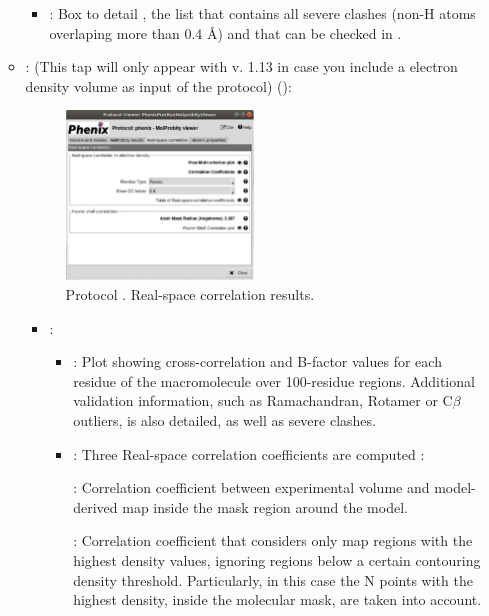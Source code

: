 \begin{itemize}
\begin{itemize}
\begin{itemize}
         \item {}: Box to detail , the list that contains all severe clashes (non-H atoms overlaping more than 0.4 \AA) and that can be checked in \coot.
        \end{itemize}
      \item {}: (This tap will only appear with \phenix v. 1.13 in case you include a electron density volume as input of the protocol) ():
       \begin{figure}[H]
         \centering 
         \captionsetup{width=.9\linewidth} 
         \includegraphics[width=0.50\textwidth]{Images_appendix/Fig146.pdf}
         \caption{Protocol . Real-space correlation results.}
         \label{fig:app_protocol_molprobity_4}
        \end{figure}
        \begin{itemize}
         \item {}: 
         \begin{itemize}
          \item {}: Plot showing cross-correlation and B-factor values for each residue of the macromolecule over 100-residue regions. Additional validation information, such as Ramachandran, Rotamer or C{$\beta$} outliers, is also detailed, as well as severe clashes.  
          \item {}: Three Real-space correlation coefficients are computed \citep{afonine2018b}: \setlength{\parindent}{12pt}
          
           : Correlation coefficient between experimental volume and model-derived map inside the mask region around the model.
           
           : Correlation coefficient that considers only map regions with the highest density values, ignoring regions below a certain contouring density threshold. Particularly, in this case the N points with the highest density, inside the molecular mask, are taken into account.
           

\end{itemize}
\end{itemize}
\end{itemize}
\end{itemize}
